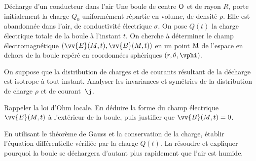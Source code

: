 

\begin{exo}[PC][1][devoir]{Décharge d'un conducteur dans l'air}
  Une boule de centre $\rm O$ et de rayon $R$, porte initialement la charge $Q_0$ uniformément répartie en volume, de densité $\rho$. Elle est abandonnée dans l'air, de conductivité électrique $\sigma$. On pose $Q(t)$ la charge électrique totale de la boule à l'instant $t$. On cherche à déterminer le champ électromagnétique $(\vv{E}(M,t),\vv{B}(M,t))$ en un point $\rm M$ de l'espace en dehors de la boule repéré en coordonnées sphériques $(r,\theta,\vphi)$.
  \begin{quest}
    \item  On suppose que la distribution de charges et de courants résultant de la décharge est isotrope à tout instant. Analyser les invariances et symétries de la distribution de charge $\rho$ et de courant~$\j$.
  \item  Rappeler la loi d'Ohm locale. En déduire la forme du champ électrique $\vv{E}(M,t)$ à l'extérieur de la boule, puis justifier que $\vv{B}(M,t)=0$.
  \item En utilisant le théorème de Gauss et la conservation de la charge, établir l'équation différentielle vérifiée par la charge $Q(t)$. La résoudre et expliquer pourquoi la boule se déchargera d'autant plus rapidement que l'air est humide.
\end{quest}
\end{exo}
